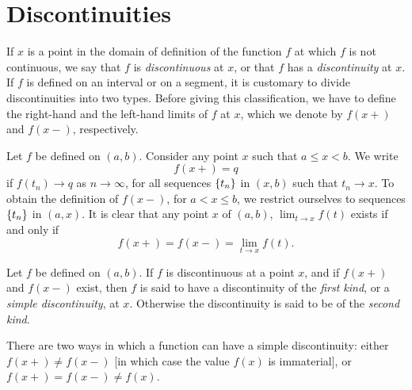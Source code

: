 \section{Discontinuities}

If $x$ is a point in the domain of definition of the function $f$ at which $f$ is not continuous, 
we say that $f$ is \emph{discontinuous} at $x$, 
or that $f$ has a \emph{discontinuity} at $x$.
If $f$ is defined on an interval or on a segment, 
it is customary to divide discontinuities into two types. 
Before giving this classification, 
we have to define the right-hand and the left-hand limits of $f$ at $x$, 
which we denote by $f(x+)$ and $f(x-)$, respectively.

\begin{mydef}
    \label{mydef:4.25}
    Let $f$ be defined on $(a, b)$. 
    Consider any point $x$ such that $a \leq x < b$. 
    We write
    \begin{equation*}
        f(x+) = q        
    \end{equation*}
    if $f(t_n) \rightarrow q$ as $n \rightarrow \infty$, 
    for all sequences $\protect\{t_n\}$ in $(x, b)$ such that $t_n \rightarrow x$. 
    To obtain the definition of $f(x-)$, 
    for $a < x \leq b$, 
    we restrict ourselves to sequences $\protect\{t_n\}$ in $(a, x)$.
    It is clear that any point $x$ of $(a, b)$, 
    $\lim_{t \to x} f(t)$ exists if and only if
    \begin{equation*}
        f(x+) = f(x-) = \lim_{t \to x} f(t).
    \end{equation*}
\end{mydef}

\begin{mydef}
    \label{mydef:4.26}
    Let $f$ be defined on $(a, b)$. 
    If $f$ is discontinuous at a point $x$,
    and if $f(x +)$ and $f (x-)$ exist, 
    then $f$ is said to have a discontinuity of the \emph{first kind}, 
    or a \emph{simple discontinuity}, at $x$. 
    Otherwise the discontinuity is said to be of the \emph{second kind}.

    There are two ways in which a function can have a simple discontinuity:
    either $f(x+) \neq f(x-)$ [in which case the value $f(x)$ is immaterial], 
    or $f(x+) = f(x-) \neq f(x)$.
\end{mydef}

